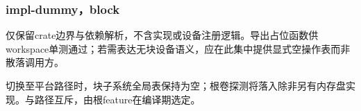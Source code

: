 
\subsubsection{impl-dummy，block}

仅保留crate边界与依赖解析，不含实现或设备注册逻辑。导出占位函数供workspace单测通过；若需表达无块设备语义，应在此集中提供显式空操作表而非散落调用方。

切换至平台路径时，块子系统全局表保持为空；根卷探测将落入除非另有内存盘实现。与路径互斥，由根feature在编译期选定。
